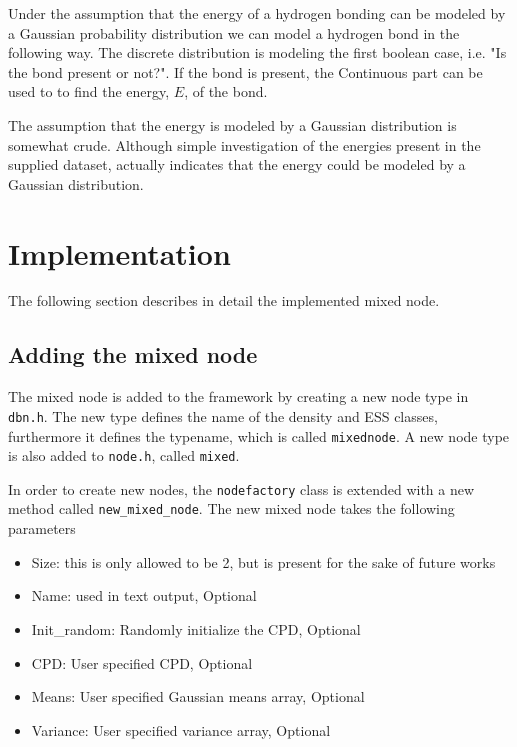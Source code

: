 \documentclass[10pt, journal, compsoc, a4paper]{IEEEtran}
\begin{document}
Under the assumption that the energy of a hydrogen bonding can be modeled by a Gaussian probability distribution we can model a hydrogen bond in the following way. The discrete distribution is modeling the first boolean case, i.e. "Is the bond present or not?". If the bond is present, the Continuous part can be used to to find the energy, $E$, of the bond.

The assumption that the energy is modeled by a Gaussian distribution is somewhat crude. Although simple investigation of the energies present in the supplied dataset, actually indicates that the energy could be modeled by a Gaussian distribution. 



\section{Implementation} %
\label{sec:implementation}
The following section describes in detail the implemented mixed node.

\subsection{Adding the mixed node} %
\label{sub:adding_the_mixed_node}
The mixed node is added to the framework by creating a new node type in \texttt{dbn.h}. The new type defines the name of the density and ESS classes, furthermore it defines the typename, which is called \texttt{mixednode}. A new node type is also added to \texttt{node.h}, called \texttt{mixed}.

In order to create new nodes, the \texttt{nodefactory} class is extended with a new method called \texttt{new\_mixed\_node}. The new mixed node takes the following parameters

\begin{itemize}
  \item Size: this is only allowed to be 2, but is present for the sake of future works
  \item Name: used in text output, Optional
  \item Init\_random: Randomly initialize the CPD, Optional
  \item CPD: User specified CPD, Optional
  \item Means: User specified Gaussian means array, Optional
  \item Variance: User specified variance array, Optional
\end{itemize}
\end{document}
